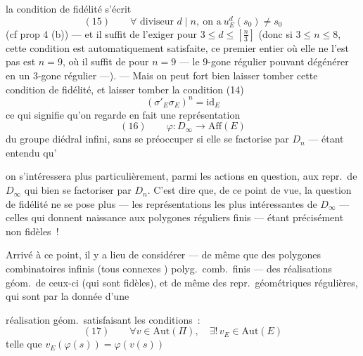 \documentclass[11pt,a4paper]{article}
\begin{document}
la condition de fidélité s'écrit
\[
  (15)\qquad \forall \text{ diviseur } d \mid n, \ \text{on a} \ u_E^{d}(s_0) \neq s_0
\]
 (cf prop 4 (b)) --- et il suffit de l'exiger pour $3 \leq d \leq \left[\frac{n}{3}\right]$ (donc si $3 \leq n \leq 8$, cette condition est automatiquement satisfaite, ce premier entier où elle ne l'est pas est $n = 9$, où il suffit de  pour $n = 9$ --- le $9$-gone régulier \struck{\ill{}} pouvant dégénérer en  un $3$-gone régulier ---). --- Mais on peut fort bien laisser tomber cette condition de fidélité, et laisser tomber  la condition (14)
\[
  (\sigma'_E \sigma_E)^{n} = \mathrm{id}_E
\]
ce qui signifie qu'on regarde en fait une représentation
\[
  (16)\qquad \varphi : D_\infty \longrightarrow \mathrm{Aff}(E)
\]
du groupe diédral infini, sans se préoccuper si elle se factorise par $D_n$ --- étant entendu qu'

on s'intéressera plus particulièrement, parmi les actions en question, aux repr.\ de $D_\infty$ qui  bien se factoriser par $D_n$. C'est dire que, \struck{\ill{}} de ce point de vue, la question de fidélité ne se pose plus --- les représentations  les plus intéressantes de $D_\infty$ \struck{\ill{}} --- celles qui donnent naissance aux polygones réguliers finis --- étant précisément non fidèles~!


Arrivé à ce point, il y a lieu de considérer --- de même que des polygones  combinatoires infinis (tous connexes ) polyg.\ comb.\ finis --- des réalisations géom.\ de ceux-ci (qui sont fidèles), et de même des repr.\ géométriques régulières, \struck{\ill{}} \struck{\ill{} \ill{} \ill{}} qui sont  par la donnée d'une

réalisation géom.\ satisfaisant les conditions~:
\[
  (17)\qquad \forall v \in \mathrm{Aut}(\Pi), \quad \exists !\, v_E \in \mathrm{Aut}(E)
\]
telle que $v_E(\varphi(s)) = \varphi(v(s))$

\end{document}
